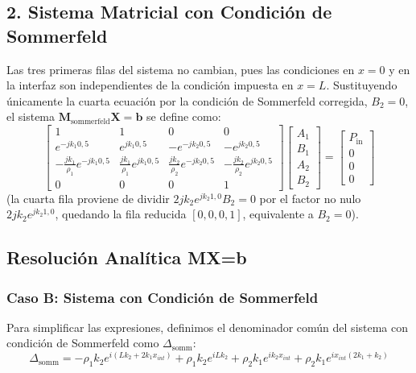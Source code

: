 \documentclass[11pt,letterpaper]{article}
\begin{document}
\subsection{2. Sistema Matricial con Condición de Sommerfeld}

Las tres primeras filas del sistema no cambian, pues las condiciones en $x=0$ y en la interfaz son independientes de la condición impuesta en $x=L$. Sustituyendo únicamente la cuarta ecuación por la condición de Sommerfeld corregida, $B_2 = 0$, el sistema $\mathbf{M}_{\text{sommerfeld}} \mathbf{X} = \mathbf{b}$ se define como:
\begin{equation}
\begin{bmatrix}
    1 & 1 & 0 & 0 \\
    e^{-j k_1 0{,}5} & e^{j k_1 0{,}5} & -e^{-j k_2 0{,}5} & -e^{j k_2 0{,}5} \\
    -\frac{j k_1}{\rho_1} e^{-j k_1 0{,}5} & \frac{j k_1}{\rho_1} e^{j k_1 0{,}5} & \frac{j k_2}{\rho_2} e^{-j k_2 0{,}5} & -\frac{j k_2}{\rho_2} e^{j k_2 0{,}5} \\
    0 & 0 & 0 & 1
\end{bmatrix}
\begin{bmatrix}
    A_1 \\ B_1 \\ A_2 \\ B_2
\end{bmatrix}
=
\begin{bmatrix}
    P_{\text{in}} \\ 0 \\ 0 \\ 0
\end{bmatrix}
\end{equation}
(la cuarta fila proviene de dividir $2jk_2e^{jk_2 1{,}0}B_2=0$ por el factor no nulo $2jk_2e^{jk_2 1{,}0}$, quedando la fila reducida $[0,0,0,1]$, equivalente a $B_2=0$).

\subsection{Resolución Analítica MX=b}

\subsubsection{Caso B: Sistema con Condición de Sommerfeld}

Para simplificar las expresiones, definimos el denominador común del sistema con condición de Sommerfeld como $\Delta_{\text{somm}}$:
\begin{equation}
    \Delta_{\text{somm}} = - \rho_{1} k_{2} e^{i \left(L k_{2} + 2 k_{1} x_{int}\right)} + \rho_{1} k_{2} e^{i L k_{2}} + \rho_{2} k_{1} e^{i k_{2} x_{int}} + \rho_{2} k_{1} e^{i x_{int} \left(2 k_{1} + k_{2}\right)}
\end{equation}
\end{document}
